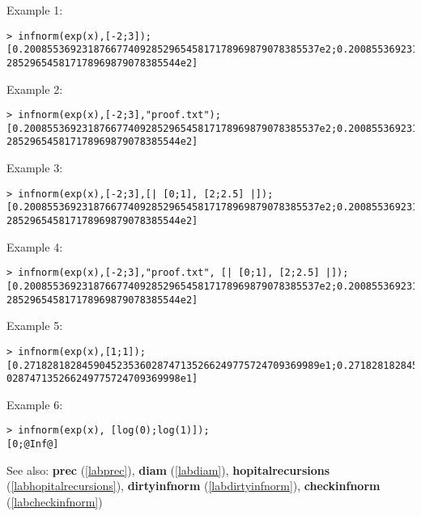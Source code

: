 \noindent Example 1: 
\begin{center}\begin{minipage}{15cm}\begin{Verbatim}[frame=single]
> infnorm(exp(x),[-2;3]);
[0.200855369231876677409285296545817178969879078385537e2;0.200855369231876677409
285296545817178969879078385544e2]
\end{Verbatim}
\end{minipage}\end{center}
\noindent Example 2: 
\begin{center}\begin{minipage}{15cm}\begin{Verbatim}[frame=single]
> infnorm(exp(x),[-2;3],"proof.txt");
[0.200855369231876677409285296545817178969879078385537e2;0.200855369231876677409
285296545817178969879078385544e2]
\end{Verbatim}
\end{minipage}\end{center}
\noindent Example 3: 
\begin{center}\begin{minipage}{15cm}\begin{Verbatim}[frame=single]
> infnorm(exp(x),[-2;3],[| [0;1], [2;2.5] |]);
[0.200855369231876677409285296545817178969879078385537e2;0.200855369231876677409
285296545817178969879078385544e2]
\end{Verbatim}
\end{minipage}\end{center}
\noindent Example 4: 
\begin{center}\begin{minipage}{15cm}\begin{Verbatim}[frame=single]
> infnorm(exp(x),[-2;3],"proof.txt", [| [0;1], [2;2.5] |]);
[0.200855369231876677409285296545817178969879078385537e2;0.200855369231876677409
285296545817178969879078385544e2]
\end{Verbatim}
\end{minipage}\end{center}
\noindent Example 5: 
\begin{center}\begin{minipage}{15cm}\begin{Verbatim}[frame=single]
> infnorm(exp(x),[1;1]);
[0.271828182845904523536028747135266249775724709369989e1;0.271828182845904523536
028747135266249775724709369998e1]
\end{Verbatim}
\end{minipage}\end{center}
\noindent Example 6: 
\begin{center}\begin{minipage}{15cm}\begin{Verbatim}[frame=single]
> infnorm(exp(x), [log(0);log(1)]);
[0;@Inf@]
\end{Verbatim}
\end{minipage}\end{center}
See also: \textbf{prec} (\ref{labprec}), \textbf{diam} (\ref{labdiam}), \textbf{hopitalrecursions} (\ref{labhopitalrecursions}), \textbf{dirtyinfnorm} (\ref{labdirtyinfnorm}), \textbf{checkinfnorm} (\ref{labcheckinfnorm})

